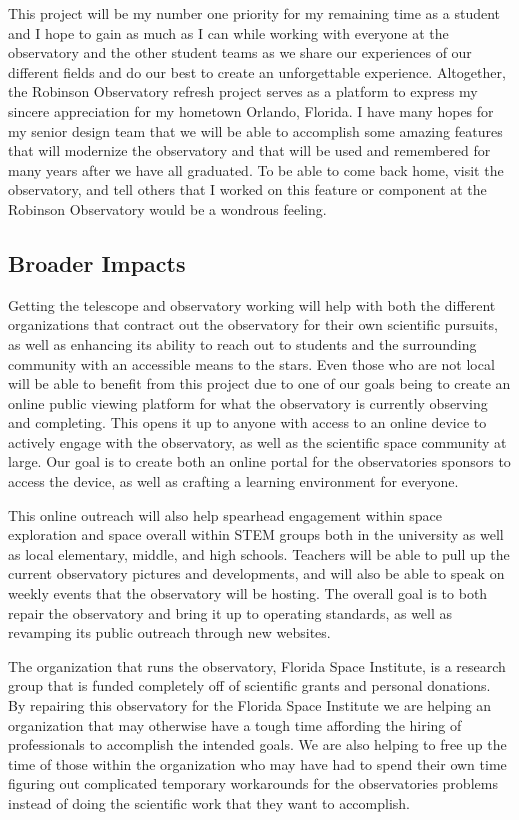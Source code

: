 \documentclass[12pt]{report}
\begin{document}
This project will be my number one priority for my remaining time as a student and I hope to gain as much as I can while working with everyone at the observatory and the other student teams as we share our experiences of our different fields and do our best to create an unforgettable experience.  Altogether, the Robinson Observatory refresh project serves as a platform to express my sincere appreciation for my hometown Orlando, Florida. I have many hopes for my senior design team that we will be able to accomplish some amazing features that will modernize the observatory and that will be used and remembered for many years after we have all graduated.  To be able to come back home, visit the observatory, and tell others that I worked on this feature or component at the Robinson Observatory would be a wondrous feeling.

\subsection*{Broader Impacts}

Getting the telescope and observatory working will help with both the different organizations that contract out the observatory for their own scientific pursuits, as well as enhancing its ability to reach out to students and the surrounding community with an accessible means to the stars. Even those who are not local will be able to benefit from this project due to one of our goals being to create an online public viewing platform for what the observatory is currently observing and completing. This opens it up to anyone with access to an online device to actively engage with the observatory, as well as the scientific space community at large. Our goal is to create both an online portal for the observatories sponsors to access the device, as well as crafting a learning environment for everyone.

This online outreach will also help spearhead engagement within space exploration and space overall within STEM groups both in the university as well as local elementary, middle, and high schools. Teachers will be able to pull up the current observatory pictures and developments, and will also be able to speak on weekly events that the observatory will be hosting. The overall goal is to both repair the observatory and bring it up to operating standards, as well as revamping its public outreach through new websites.

The organization that runs the observatory, Florida Space Institute, is a research group that is funded completely off of scientific grants and personal donations. By repairing this observatory for the Florida Space Institute we are helping an organization that may otherwise have a tough time affording the hiring of professionals to accomplish the intended goals. We are also helping to free up the time of those within the organization who may have had to spend their own time figuring out complicated temporary workarounds for the observatories problems instead of doing the scientific work that they want to accomplish.
\end{document}
